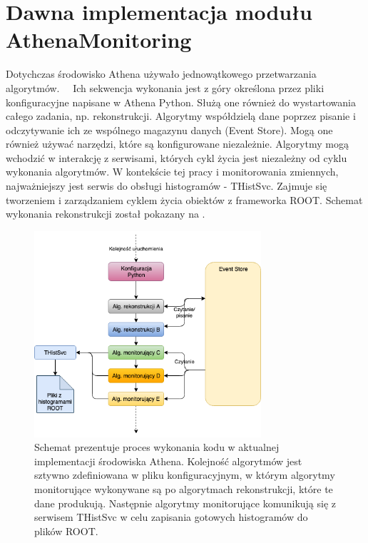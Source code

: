 \section{Dawna implementacja modułu AthenaMonitoring}
Dotychczas środowisko Athena używało jednowątkowego przetwarzania algorytmów.~\cite{tbold-hab-thesis}~\cite{atlas-multithread-presentation}
Ich sekwencja wykonania jest z góry określona przez pliki konfiguracyjne napisane w Athena Python. 
Służą one również do wystartowania całego zadania, np. rekonstrukcji. 
Algorytmy współdzielą dane poprzez pisanie i odczytywanie ich ze wspólnego magazynu danych (Event Store). 
Mogą one również używać narzędzi, które są konfigurowane niezależnie. 
Algorytmy mogą wchodzić w interakcję z serwisami, których cykl życia jest niezależny od cyklu wykonania algorytmów.
W kontekście tej pracy i monitorowania zmiennych, najważniejszy jest serwis do obsługi histogramów - THistSvc.
Zajmuje się tworzeniem i zarządzaniem cyklem życia obiektów z frameworka ROOT.
Schemat wykonania rekonstrukcji został pokazany na .

\begin{figure}[!ht]
\centering
\includegraphics[width=0.75\textwidth]{img/old_flow.png}
\caption{
Schemat prezentuje proces wykonania kodu w aktualnej implementacji środowiska Athena. 
Kolejność algorytmów jest sztywno zdefiniowana w pliku konfiguracyjnym, w którym algorytmy monitorujące wykonywane są po algorytmach rekonstrukcji, które te dane produkują. 
Następnie algorytmy monitorujące komunikują się z serwisem THistSvc w celu zapisania gotowych histogramów do plików ROOT.
}
\label{fig:athena:oldFlow}
\end{figure}

